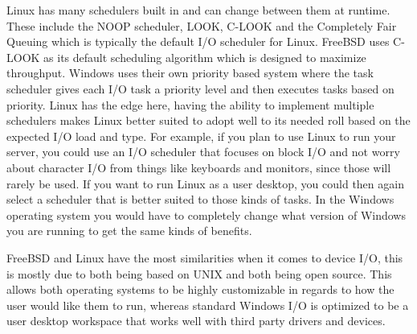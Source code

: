 \documentclass[10pt,serif,draftclsnofoot,onecolumn]{IEEEtran}
\begin{document}
	\par
			Linux has many schedulers built in and can change between them at runtime. These include the NOOP scheduler, LOOK, C-LOOK and the Completely Fair Queuing which is typically the default I/O scheduler for Linux\cite{2}. FreeBSD uses C-LOOK as its default scheduling algorithm which is designed to maximize throughput\cite{7}. Windows uses their own priority based system where the task scheduler gives each I/O task a priority level and then executes tasks based on priority. Linux has the edge here, having the ability to implement multiple schedulers makes Linux better suited to adopt well to its needed roll based on the expected I/O load and type. For example, if you plan to use Linux to run your server, you could use an I/O scheduler that focuses on block I/O and not worry about character I/O from things like keyboards and monitors, since those will rarely be used. If you want to run Linux as a user desktop, you could then again select a scheduler that is better suited to those kinds of tasks. In the Windows operating system you would have to completely change what version of Windows you are running to get the same kinds of benefits.
	\newline
	\newline
	\par
			FreeBSD and Linux have the most similarities when it comes to device I/O, this is mostly due to both being based on UNIX and both being open source. This allows both operating systems to be highly customizable in regards to how the user would like them to run, whereas standard Windows I/O is optimized to be a user desktop workspace that works well with third party drivers and devices.
	\newpage


	
	
\end{document}
